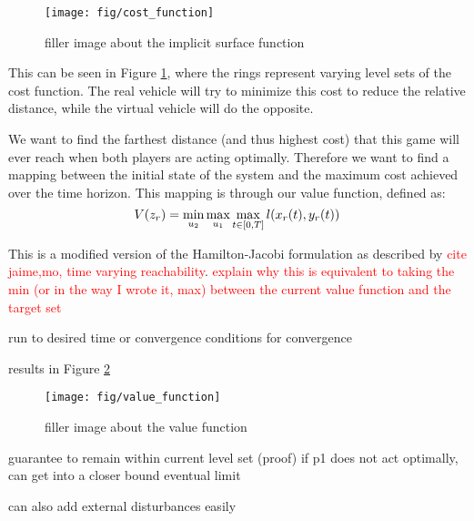 \begin{figure}
	\centering
	\texttt{[image: fig/cost\_function]}
	\caption{filler image about the implicit surface function}
	\label{fig:cost}
\end{figure} 

 This can be seen in Figure \ref{fig:cost}, where the rings represent varying level sets of the cost function. The real vehicle will try to minimize this cost to reduce the relative distance, while the virtual vehicle will do the opposite.
 
 We want to find the farthest distance (and thus highest cost) that this game will ever reach when both players are acting optimally. Therefore we want to find a mapping between the initial state of the system and the maximum cost achieved over the time horizon. This mapping is through our value function, defined as:
 \begin{equation}
 	V(z_r)= \min_{u_2} \max_{u_1} \max_{t\in [0,T]} l(x_r(t),y_r(t))
 \end{equation} 
 
 This is a modified version of the Hamilton-Jacobi formulation as described by \textcolor{red}{cite jaime,mo, time varying reachability}. \textcolor{red}{explain why this is equivalent to taking the min (or in the way I wrote it, max) between the current value function and the target set}
 
 run to desired time or convergence
 conditions for convergence
 
 results in Figure \ref{fig:value}
 
 
 \begin{figure}
 	\centering
 	\texttt{[image: fig/value\_function]}
 	\caption{filler image about the value function}
 	\label{fig:value}
 \end{figure} 
 guarantee to remain within current level set (proof)
 if p1 does not act optimally, can get into a closer bound
 eventual limit
 
 can also add external disturbances easily
 